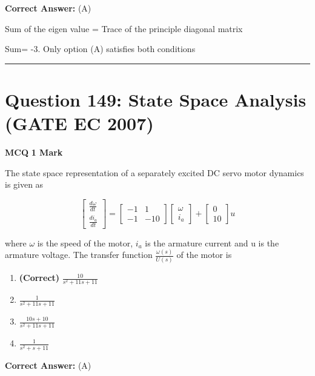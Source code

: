 \documentclass[11pt,a4paper]{article}
\begin{document}
\noindent \textbf{Correct Answer:} (A)

\begin{tcolorbox}[solbox, title=Detailed Solution -- Question 148]
Sum of the eigen value = Trace of the principle
diagonal matrix

Sum= -3. Only option (A) satisfies both conditions
\end{tcolorbox}

\vspace{1.5em}
\hrule
\vspace{1.5em}

\section*{Question 149: State Space Analysis (GATE EC 2007)}
\noindent \textbf{\color{primary}MCQ} \hfill \textbf{\color{secondary}1 Mark}


\noindent The state space representation of a separately excited DC servo motor dynamics
is given as 

\[
\begin{bmatrix} \frac{d\omega }{dt}\\ \frac{di_{a}}{dt} \end{bmatrix}=\begin{bmatrix} -1 & 1\\ -1&-10 \end{bmatrix}\begin{bmatrix} \omega \\ i_{a} \end{bmatrix}+\begin{bmatrix} 0\\ 10 \end{bmatrix}u
\]

  where $\omega$ is the speed of the motor, $i_{a}$ is the armature current and u is the armature voltage. The transfer function $\frac{\omega (s)}{U(s)}$ of the motor is


\begin{enumerate}[label=(\Alph*)]
    \item \textbf{(Correct)} $\frac{10}{s^{2}+11s+11}$
    \item $\frac{1}{s^{2}+11s+11}$
    \item $\frac{10s+10}{s^{2}+11s+11}$
    \item $\frac{1}{s^{2}+s+11}$
\end{enumerate}

\noindent \textbf{Correct Answer:} (A)
\end{document}
